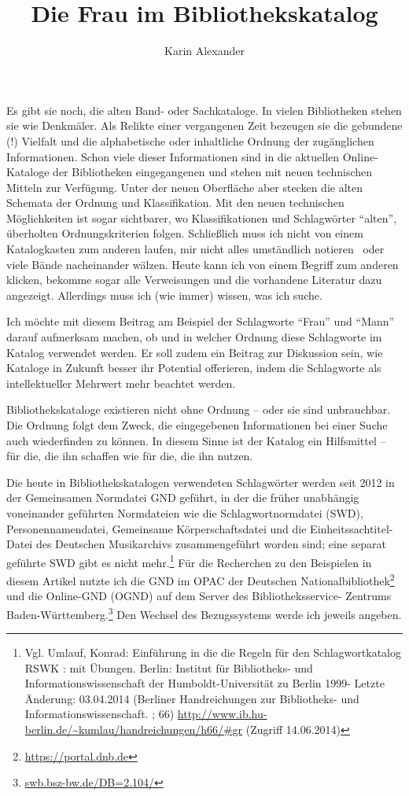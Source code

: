 \documentclass[a4paper,
fontsize=11pt,
oneside,
numbers=noperiodatend,
parskip=half-,
bibliography=totoc,
final
]{scrartcl}
\title{\LARGE{Die Frau im Bibliothekskatalog}} %
\author{Karin Alexander} %
\date{}
\begin{document}
\maketitle
\thispagestyle{fancyplain} 


Es gibt sie noch, die alten Band- oder Sachkataloge. In vielen
Bibliotheken stehen sie wie Denk\-mäl\-er. Als Relikte einer vergangenen
Zeit bezeugen sie die gebundene (!) Vielfalt und die alphabetische oder
inhaltliche Ordnung der zugänglichen Informationen. Schon viele dieser
Informationen sind in die aktuellen Online-Kataloge der Bibliotheken
eingegangenen und stehen mit neuen technischen Mitteln zur Verfügung.
Unter der neuen Oberfläche aber stecken die alten Schemata der Ordnung
und Klassifikation. Mit den neuen technischen Möglichkeiten ist sogar
sichtbarer, wo Klassifikationen und Schlagwörter \enquote{alten},
überholten Ordnungskriterien folgen. Schließlich muss ich nicht von
einem Katalogkasten zum anderen laufen, mir nicht alles umständlich
notieren~ oder viele Bände nacheinander wälzen. Heute kann ich von einem
Begriff zum anderen klicken, bekomme sogar alle Verweisungen und die
vorhandene Literatur dazu angezeigt. Allerdings muss ich (wie immer)
wissen, was ich suche.~

Ich möchte mit diesem Beitrag am Beispiel der Schlagworte \enquote{Frau}
und \enquote{Mann} darauf aufmerksam machen, ob und in welcher Ordnung
diese Schlagworte im Katalog verwendet werden. Er soll zudem ein Beitrag
zur Diskussion sein, wie Kataloge in Zukunft besser ihr Potential
offerieren, indem die Schlagworte als intellektueller Mehrwert mehr
beachtet werden.

Bibliothekskataloge existieren nicht ohne Ordnung -- oder sie sind
unbrauchbar. Die Ordnung folgt dem Zweck, die eingegebenen Informationen
bei einer Suche auch wiederfinden zu können. In diesem Sinne ist der
Katalog ein Hilfsmittel -- für die, die ihn schaffen wie für die, die
ihn nutzen.

Die heute in Bibliothekskatalogen verwendeten Schlagwörter werden seit
2012 in der Gemeinsamen Normdatei GND geführt, in der die früher
unabhängig voneinander geführten Normdateien wie die Schlagwortnormdatei
(SWD), Personennamendatei, Gemeinsame Körperschaftsdatei und die
Einheitssachtitel-Datei des Deutschen Musikarchivs zusammengeführt
worden sind; eine separat geführte SWD gibt es nicht mehr.\footnote{Vgl.
  Umlauf, Konrad: Einführung in die die Regeln für den Schlagwortkatalog
  RSWK : mit Übungen. Berlin: Institut für Bibliotheks- und
  Informationswissenschaft der Humboldt-Universität zu Berlin 1999-
  Letzte Änderung: 03.04.2014 (Berliner Handreichungen zur Bibliotheks-
  und Informationswissenschaft. ; 66)
  \href{http://www.ib.hu-berlin.de/~kumlau/handreichungen/h66/xgr}{http://www.ib.hu-berlin.de/\textasciitilde{}kumlau/handreichungen/h66/\#gr}
  (Zugriff 14.06.2014)} Für die Recherchen zu den Beispielen in diesem
Artikel nutzte ich die GND im OPAC der Deutschen
Nationalbibliothek\footnote{\url{https://portal.dnb.de}} und die
Online-GND (OGND) auf dem Server des Bibliotheksservice- Zentrums
Baden-Württemberg.\footnote{\url{swb.bsz-bw.de/DB=2.104/}} Den Wechsel
des Bezugssystems werde ich jeweils angeben.
\end{document}
